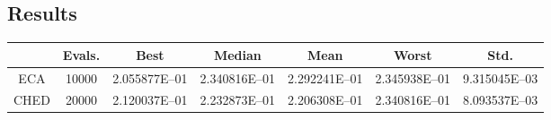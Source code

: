 \documentclass[12pt,letterpape]{article}
\begin{document}



\subsection{Results} %
\label{sub:results}


\begin{table}[!ht]
	\centering
	\begin{tabular}{ccccccc}
		\hline
		& {\bf Evals.} & {\bf Best} & {\bf Median} & {\bf Mean} & {\bf Worst} & {\bf Std.} \\ \hline
		ECA & 10000 & 2.055877E--01 & 2.340816E--01 & 2.292241E--01 & 2.345938E--01 & 9.315045E--03 \\ \hline
		CHED & 20000 & 2.120037E--01 & 2.232873E--01 & 2.206308E--01 & 2.340816E--01 & 8.093537E--03 \\ \hline
	\end{tabular}
\end{table}




\clearpage


\end{document}
